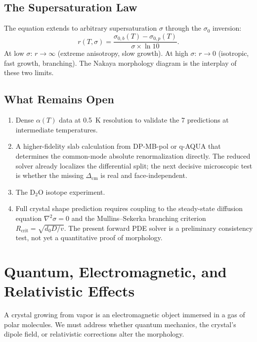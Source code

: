 \documentclass[12pt,letterpaper]{article}
\begin{document}
\subsection{The Supersaturation Law}

The equation extends to arbitrary supersaturation $\sigma$ through the $\sigma_0$ inversion:
\begin{equation}
r(T, \sigma) = \frac{\sigma_{0,b}(T) - \sigma_{0,p}(T)}{\sigma \times \ln 10}.
\end{equation}
At low $\sigma$: $r \to \infty$ (extreme anisotropy, slow growth).  At high $\sigma$: $r \to 0$ (isotropic, fast growth, branching).  The Nakaya morphology diagram is the interplay of these two limits.

\subsection{What Remains Open}

\begin{enumerate}[nosep]
\item Dense $\alpha(T)$ data at 0.5~K resolution to validate the 7 predictions at intermediate temperatures.
\item A higher-fidelity slab calculation from DP-MB-pol or q-AQUA that determines the common-mode absolute renormalization directly.  The reduced solver already localizes the differential split; the next decisive microscopic test is whether the missing $\Delta_{\mathrm{cm}}$ is real and face-independent.
\item The D$_2$O isotope experiment.
\item Full crystal shape prediction requires coupling to the steady-state diffusion equation $\nabla^2 \sigma = 0$ and the Mullins--Sekerka branching criterion $R_{\mathrm{crit}} = \sqrt{d_0 D / v}$.  The present forward PDE solver is a preliminary consistency test, not yet a quantitative proof of morphology.
\end{enumerate}

\section{Quantum, Electromagnetic, and Relativistic Effects}
\label{sec:quantum}

A crystal growing from vapor is an electromagnetic object immersed in a gas of polar molecules.  We must address whether quantum mechanics, the crystal's dipole field, or relativistic corrections alter the morphology.
\end{document}
